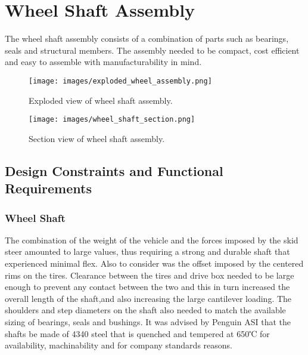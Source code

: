 \section{Wheel Shaft Assembly}
The wheel shaft assembly consists of a combination of parts such as bearings, seals and structural members. The assembly needed to be compact, cost efficient and easy to assemble with manufacturability in mind. %

\begin{figure}[h]\centering
	\texttt{[image: images/exploded\_wheel\_assembly.png]}
	\caption{Exploded view of wheel shaft assembly.}
	\label{fig:wheel_explode}
\end{figure}

\begin{figure}[h]\centering
	\texttt{[image: images/wheel\_shaft\_section.png]}
	\caption{Section view of wheel shaft assembly.}
	\label{fig:wheel_section}
\end{figure}

\subsection{Design Constraints and Functional Requirements}
\subsubsection{Wheel Shaft}
The combination of the weight of the vehicle and the forces imposed by the skid steer amounted to large values, thus requiring a strong and durable shaft that experienced minimal flex. Also to consider was the offset imposed by the centered rims on the tires. Clearance between the tires and drive box needed to be large enough to prevent any contact between the two and this in turn increased the overall length of the shaft,and also increasing the large cantilever loading. The shoulders and step diameters on the shaft also needed to match the available sizing of bearings, seals and bushings. It was advised by Penguin ASI that the shafts be made of 4340 steel that is quenched and tempered at 650℃ for availability, machinability and for company standards reasons.

